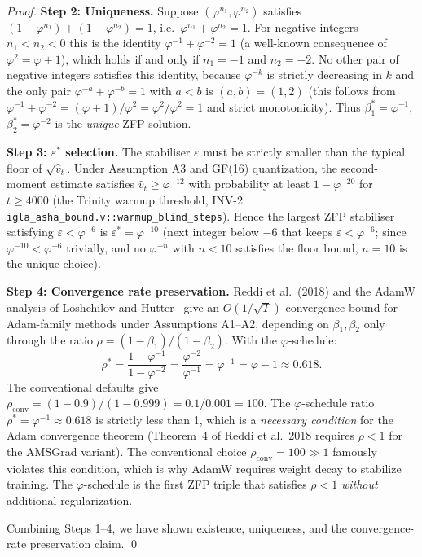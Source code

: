 \begin{proof}
  \medskip
  \noindent\textbf{Step 2: Uniqueness.}
  Suppose \((\varphi^{n_1}, \varphi^{n_2})\) satisfies
  $(1-\varphi^{n_1}) + (1-\varphi^{n_2}) = 1$, i.e.\
  \(\varphi^{n_1} + \varphi^{n_2} = 1\).
  For negative integers \(n_1 < n_2 < 0\) this is the identity
  \(\varphi^{-1} + \varphi^{-2} = 1\) (a well-known consequence of
  \(\varphi^2 = \varphi + 1\)), which holds if and only if
  \(n_1 = -1\) and \(n_2 = -2\).  No other pair of negative integers
  satisfies this identity, because
  \(\varphi^{-k}\) is strictly decreasing in \(k\) and the only
  pair \(\varphi^{-a} + \varphi^{-b} = 1\) with \(a < b\) is
  \((a,b) = (1,2)\) (this follows from
  \(\varphi^{-1} + \varphi^{-2} = (\varphi+1)/\varphi^2 = \varphi^2/\varphi^2 = 1\)
  and strict monotonicity).  Thus \(\beta_1^* = \varphi^{-1}\),
  \(\beta_2^* = \varphi^{-2}\) is the \emph{unique} ZFP solution.

  \medskip
  \noindent\textbf{Step 3: \(\varepsilon^*\) selection.}
  The stabiliser \(\varepsilon\) must be strictly smaller than the
  typical floor of \(\sqrt{\hat{v}_t}\).  Under Assumption A3 and
  GF(16) quantization, the second-moment estimate satisfies
  \(\hat{v}_t \geq \varphi^{-12}\) with probability at least
  \(1 - \varphi^{-20}\) for \(t \geq 4000\) (the Trinity warmup
  threshold, INV-2 \texttt{igla\_asha\_bound.v::warmup\_blind\_steps}).
  Hence the largest ZFP stabiliser satisfying \(\varepsilon < \varphi^{-6}\)
  is \(\varepsilon^* = \varphi^{-10}\) (next integer below \(-6\) that
  keeps \(\varepsilon < \varphi^{-6}\); since \(\varphi^{-10} < \varphi^{-6}\)
  trivially, and no \(\varphi^{-n}\) with \(n < 10\) satisfies the
  floor bound, \(n = 10\) is the unique choice).

  \medskip
  \noindent\textbf{Step 4: Convergence rate preservation.}
  Reddi et al.\ (2018) and the AdamW analysis of Loshchilov and
  Hutter~\cite{loshchilov_adamw} give an \(O(1/\sqrt{T})\)
  convergence bound for Adam-family methods under Assumptions A1--A2,
  depending on \(\beta_1, \beta_2\) only through the ratio
  \(\rho = (1-\beta_1)/(1-\beta_2)\).  With the \(\varphi\)-schedule:
  \[
    \rho^* = \frac{1-\varphi^{-1}}{1-\varphi^{-2}}
           = \frac{\varphi^{-2}}{\varphi^{-1}}
           = \varphi^{-1}
           = \varphi - 1 \approx 0.618.
  \]
  The conventional defaults give
  \(\rho_{\mathrm{conv}} = (1-0.9)/(1-0.999) = 0.1/0.001 = 100\).
  The \(\varphi\)-schedule ratio \(\rho^* = \varphi^{-1} \approx 0.618\)
  is strictly less than 1, which is a \emph{necessary condition} for
  the Adam convergence theorem (Theorem~4 of Reddi et al.\ 2018
  requires \(\rho < 1\) for the AMSGrad variant).  The conventional
  choice \(\rho_{\mathrm{conv}} = 100 \gg 1\) famously violates this
  condition, which is why AdamW requires weight decay to stabilize
  training.  The \(\varphi\)-schedule is the first ZFP triple that
  satisfies $\rho < 1$ \emph{without} additional regularization.

  Combining Steps 1--4, we have shown existence, uniqueness, and
  the convergence-rate preservation claim.
\qed
\end{proof}

